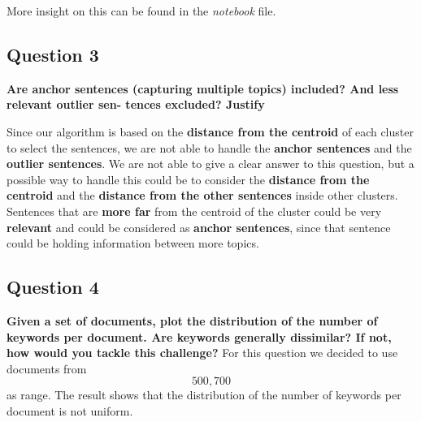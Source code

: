 More insight on this can be found in the \textit{notebook} file.


\subsection{Question 3}
\textbf{ Are anchor sentences (capturing multiple topics) included? And less relevant outlier sen- tences excluded? Justify}

Since our algorithm is based on the \textbf{distance from the centroid} of each cluster to select the sentences, 
we are not able to handle the \textbf{anchor sentences} and the \textbf{outlier sentences}. We are not able to give a clear answer to this question, but 
a possible way to handle this could be to consider the \textbf{distance from the centroid} and the \textbf{distance from the other sentences} inside other clusters. 
Sentences that are \textbf{more far} from the centroid of the cluster could be very \textbf{relevant} and could be considered as \textbf{anchor sentences}, since that 
sentence could be holding information between more topics. 

\subsection{Question 4}
\textbf{Given a set of documents, plot the distribution of the number of keywords per document. Are keywords generally dissimilar? If not, how would you tackle this challenge?}
For this question we decided to use documents from \[500,700\] as range. The result shows that the distribution of the number of keywords per document is not uniform.

